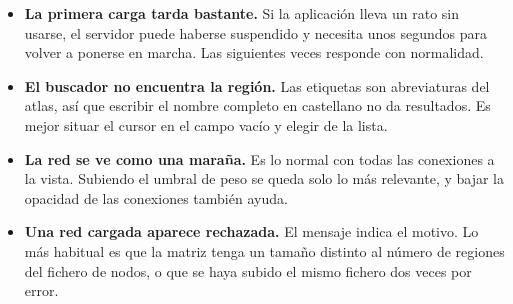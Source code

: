 \begin{itemize}
	\item \textbf{La primera carga tarda bastante.} Si la aplicación lleva un rato sin usarse, el
		servidor puede haberse suspendido y necesita unos segundos para volver a ponerse en marcha.
		Las siguientes veces responde con normalidad.
	\item \textbf{El buscador no encuentra la región.} Las etiquetas son abreviaturas del atlas, así
		que escribir el nombre completo en castellano no da resultados. Es mejor situar el cursor en
		el campo vacío y elegir de la lista.
	\item \textbf{La red se ve como una maraña.} Es lo normal con todas las conexiones a la vista.
		Subiendo el umbral de peso se queda solo lo más relevante, y bajar la opacidad de las
		conexiones también ayuda.
	\item \textbf{Una red cargada aparece rechazada.} El mensaje indica el motivo. Lo más habitual es
		que la matriz tenga un tamaño distinto al número de regiones del fichero de nodos, o que se
		haya subido el mismo fichero dos veces por error.
\end{itemize}
